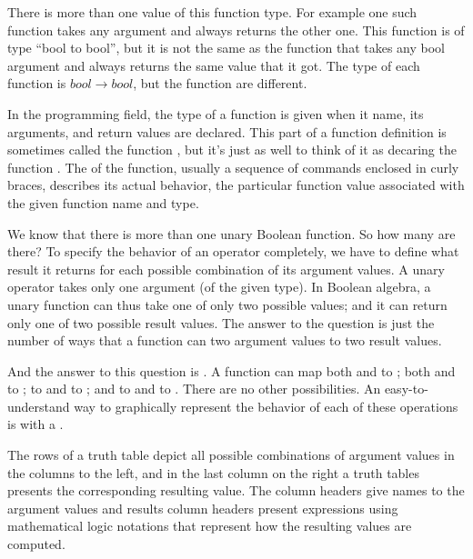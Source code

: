 \documentclass[letterpaper,10pt,english]{sphinxmanual}
\begin{document}
There is more than one value of this function type. For example one
such function takes any  argument and always returns the other
one. This function is of type “bool to bool”, but it is not the same
as the function that takes any bool argument and always returns the
same value that it got. The type of each function is \(bool
\rightarrow bool\), but the function  are different.

In the programming field, the type of a function is given when it
name, its arguments, and return values are declared. This part of a
function definition is sometimes called the function , but
it’s just as well to think of it as decaring the function .  The
 of the function, usually a sequence of commands enclosed in
curly braces, describes its actual behavior, the particular function
value associated with the given function name and type.

We know that there is more than one unary Boolean function. So how
many are there? To specify the behavior of an operator completely, we
have to define what result it returns for each possible combination of
its argument values. A unary operator takes only one argument (of the
given type). In Boolean algebra, a unary function can thus take one of
only two possible values; and it can return only one of two possible
result values. The answer to the question is just the number of ways
that a function can  two argument values to two result values.

And the answer to this question is . A function can map both 
and  to ; both  and  to ;  to  and  to ;
and  to  and  to . There are no other possibilities. An
easy-to-understand way to graphically represent the behavior of each
of these operations is with a .

The rows of a truth table depict all possible combinations of argument
values in the columns to the left, and in the last column on the right
a truth tables presents the corresponding resulting value.  The column
headers give names to the argument values and results column headers
present expressions using mathematical logic notations that represent
how the resulting values are computed.
\end{document}
